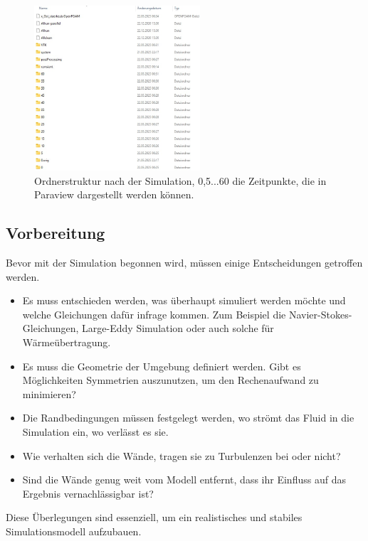 \begin{figure}
    \centering
    \includegraphics[width=0.55\textwidth]{papers/openfoam/Bilder/Ordnerstruktur_Simuliert.jpg}
    \caption{Ordnerstruktur nach der Simulation, 0,5...60 die Zeitpunkte, die in Paraview dargestellt werden können.}
    \label{fig:ordStrktSim}
\end{figure}

\subsection{Vorbereitung \label{openfoam:section:Vorbereitung}}
Bevor mit der Simulation begonnen wird, müssen einige Entscheidungen getroffen werden.
\begin{itemize}
    \item Es muss entschieden werden, was überhaupt simuliert werden möchte und welche Gleichungen dafür infrage kommen.
    Zum Beispiel die Navier-Stokes-Gleichungen, Large-Eddy Simulation oder auch solche für Wärmeübertragung.
    \item Es muss die Geometrie der Umgebung definiert werden. 
    Gibt es Möglichkeiten Symmetrien auszunutzen, um den Rechenaufwand zu minimieren?
    \item Die Randbedingungen müssen festgelegt werden, wo strömt das Fluid in die Simulation ein, wo verlässt es sie.
    \item Wie verhalten sich die Wände, tragen sie zu Turbulenzen bei oder nicht?
    \item Sind die Wände genug weit vom Modell entfernt, dass ihr Einfluss auf das Ergebnis vernachlässigbar ist?
\end{itemize} 
Diese Überlegungen sind essenziell, um ein realistisches und stabiles Simulationsmodell aufzubauen.

